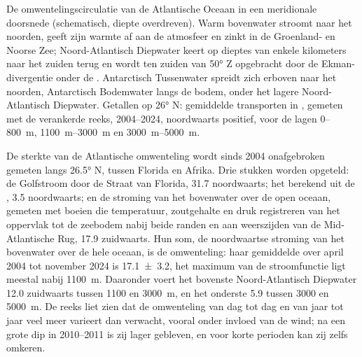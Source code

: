 \begin{omfigure}
{\small De omwentelingscirculatie van de Atlantische Oceaan in een meridionale doorsnede (schematisch, diepte overdreven). Warm bovenwater stroomt naar het noorden, geeft zijn warmte af aan de atmosfeer en zinkt in de Groenland- en Noorse Zee; Noord-Atlantisch Diepwater keert op dieptes van enkele kilometers naar het zuiden terug en wordt ten zuiden van \ang{50} Z opgebracht door de Ekman-divergentie onder de . Antarctisch Tussenwater spreidt zich erboven naar het noorden, Antarctisch Bodemwater langs de bodem, onder het lagere Noord-Atlantisch Diepwater. Getallen op \ang{26} N: gemiddelde transporten in , gemeten met de verankerde reeks, 2004--2024, noordwaarts positief, voor de lagen 0--\qty{800}{m}, \qtyrange{1100}{3000}{m} en
\qtyrange{3000}{5000}{m}.}
\label{fig:b1:ocean-circulation:moc}
\end{omfigure}

De sterkte van de Atlantische omwenteling wordt sinds 2004 onafgebroken gemeten langs \ang{26.5} N, tussen Florida en Afrika. Drie stukken worden opgeteld: de Golfstroom door de Straat van Florida, \qty{31.7}{\sverdrup} noordwaarts; het  berekend uit de , \qty{3.5}{\sverdrup} noordwaarts; en de stroming van het bovenwater over de open oceaan, gemeten met boeien die temperatuur, zoutgehalte en druk registreren van het oppervlak tot de zeebodem nabij beide randen en aan weerszijden van de Mid-Atlantische Rug, \qty{17.9}{\sverdrup} zuidwaarts. Hun som, de noordwaartse stroming van het bovenwater over de hele oceaan, is de omwenteling: haar gemiddelde over april 2004 tot november 2024 is \qty[uncertainty-mode=separate]{17.1 \pm 3.2}{\sverdrup}, het maximum van de stroomfunctie ligt meestal nabij \qty{1100}{m}. Daaronder voert het bovenste Noord-Atlantisch Diepwater \qty{12.0}{\sverdrup} zuidwaarts tussen 1100 en \qty{3000}{m}, en het onderste \qty{5.9}{\sverdrup} tussen 3000 en \qty{5000}{m}. De reeks liet zien dat de omwenteling van dag tot dag en van jaar tot jaar veel meer varieert dan verwacht, vooral onder invloed van de wind; na een grote dip in 2010--2011 is zij lager gebleven, en voor korte perioden kan zij zelfs omkeren.

